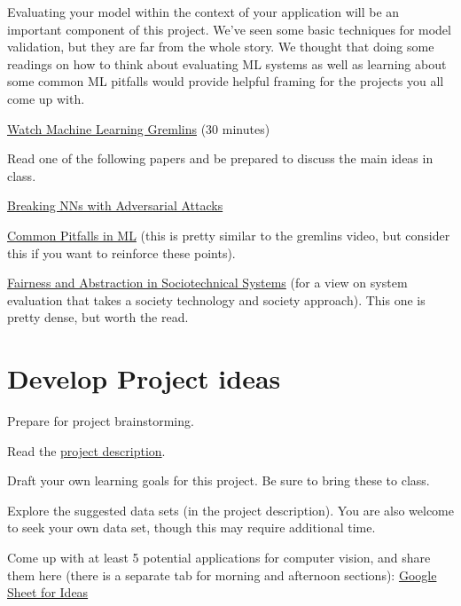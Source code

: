 \documentclass[assignment08_Solutions]{subfiles}
\begin{document}
\begin{exercise}[(80 minutes)]
Evaluating your model within the context of your application will be an important component of this project.  We've seen some basic techniques for model validation, but they are far from the whole story.  We thought that doing some readings on how to think about evaluating ML systems as well as learning about some common ML pitfalls would provide helpful framing for the projects you all come up with.

\bes
\item \href{https://www.youtube.com/watch?v=tleeC-KlsKA}{Watch Machine Learning Gremlins} (30 minutes)
\item Read one of the following papers and be prepared to discuss the main ideas in class.
\bi
\item \href{https://towardsdatascience.com/breaking-neural-networks-with-adversarial-attacks-f4290a9a45aa}{Breaking NNs with Adversarial Attacks}
\item \href{http://danielnee.com/2015/01/common-pitfalls-in-machine-learning/}{Common Pitfalls in ML} (this is pretty similar to the gremlins video, but consider this if you want to reinforce these points).
\item \href{https://dl.acm.org/citation.cfm?id=3287598}{Fairness and Abstraction in Sociotechnical Systems} (for a view on system evaluation that takes a society technology and society approach).  This one is pretty dense, but worth the read.
\ei
\ees

\end{exercise}


\section{Develop Project ideas}

\begin{exercise}
Prepare for project brainstorming.
\bes
\item Read the \href{https://github.com/olincollege/MLfall2021/blob/master/Module\%201/m1_project/m1_project.pdf}{project description}.
\item Draft your own learning goals for this project. Be sure to bring these to class.
\item Explore the suggested data sets (in the project description). You are also welcome to seek your own data set, though this may require additional time.
\item Come up with at least 5 potential applications for computer vision, and share them here (there is a separate tab for morning and afternoon sections): \href{https://docs.google.com/spreadsheets/d/1TyzKsfdCvZEzfaYswfJSHiYH2JU73gd0KCIOwQijvFo/edit?usp=sharing}{Google Sheet for Ideas} 
\ees 
\end{exercise}
 
\end{document}
